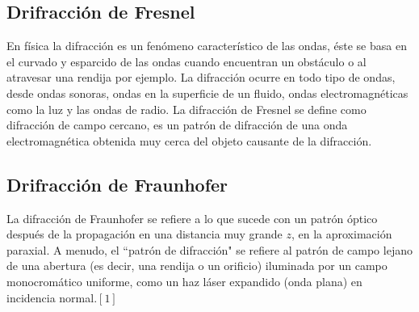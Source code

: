 \documentclass[11pt,letterpaper,twocolumn]{article}
\begin{document}
\subsection*{Drifracción de Fresnel}
En física la difracción es un fenómeno característico de las ondas, éste se basa en el curvado y esparcido de las ondas cuando encuentran un obstáculo o al atravesar una rendija por ejemplo. La difracción ocurre en todo tipo de ondas, desde ondas sonoras, ondas en la superficie de un fluido, ondas electromagnéticas como la luz y las ondas de radio. La difracción de Fresnel se define como difracción de campo cercano, es un patrón de difracción de una onda electromagnética obtenida muy cerca del objeto causante de la difracción. 
\subsection*{Drifracción de Fraunhofer}
La difracción de Fraunhofer se refiere a lo que sucede con un patrón óptico después de la propagación en una distancia muy grande $z$, en la aproximación paraxial. A menudo, el ``patrón de difracción" se refiere al patrón de campo lejano de una abertura (es decir, una rendija o un orificio) iluminada por un campo monocromático uniforme, como un haz láser expandido (onda plana) en incidencia normal.${[1]}$
\end{document}
